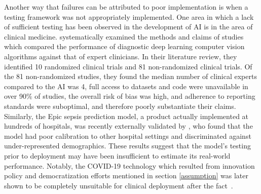 \documentclass[acmconf,manuscript,screen,natbib=true]{acmart}
\begin{document}
Another way that failures can be attributed to poor implementation is when a testing framework was not appropriately implemented. 
One area in which a lack of sufficient testing has been observed in the development of AI is in the area of clinical medicine. \citet{ai_vs_clinicians} systematically examined the methods and claims of studies which compared the performance of diagnostic deep learning computer vision algorithms against that of expert clinicians. In their literature review, they identified 10 randomized clinical trials and 81 non-randomized clinical trials. Of the 81 non-randomized studies, they found the median number of clinical experts compared to the AI was 4, full access to datasets and code were unavailable in over 90\% of studies, the overall risk of bias was high, and adherence to reporting standards were suboptimal, and therefore poorly substantiate their claims. %
Similarly, the Epic sepsis prediction model, a product actually implemented at hundreds of hospitals, was recently externally validated by \citet{sepsis_validation}, who found that the model had poor calibration to other hospital settings and discriminated against under-represented demographics. %
These results suggest that the model's testing prior to deployment may have been insufficient to estimate its real-world performance.
Notably, the COVID-19 technology which resulted from innovation policy and democratization efforts mentioned in section \ref{assumption} 
was later shown to be completely unsuitable for clinical deployment after the fact~\cite{covidfail_summ, covidfail1, covidfail2, covidfail3}.


\end{document}
